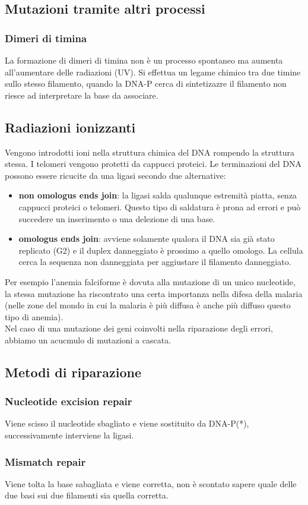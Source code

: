     \subsection{Mutazioni tramite altri processi}
        \subsubsection{Dimeri di timina}
            La formazione di dimeri di timina non è un processo spontaneo ma aumenta all'aumentare delle radiazioni (UV). Si effettua un legame chimico tra due timine sullo stesso filamento, quando la DNA-P cerca di sintetizazre il filamento non riesce ad interpretare la base da associare.
        \subsection{Radiazioni ionizzanti}
            Vengono introdotti ioni nella struttura chimica del DNA rompendo la struttura stessa.
            I telomeri vengono protetti da cappucci proteici.
            Le terminazioni del DNA possono essere ricucite da una ligasi secondo due alternative:
            \begin{itemize}
                \item \textbf{non omologus ends join}: la ligasi salda qualunque estremità piatta, senza cappucci proteici o telomeri. Questo tipo di saldatura è prona ad errori e può succedere un inserimento o una delezione di una base.
                \item \textbf{omologus ends join}: avviene solamente qualora il DNA sia già stato replicato (G2) e il duplex danneggiato è prossimo a quello omologo. La cellula cerca la sequenza non danneggiata per aggiustare il filamento danneggiato.
            \end{itemize} 
            Per esempio l'anemia falciforme è dovuta alla mutazione di un unico nucleotide, la stessa mutazione ha riscontrato una certa importanza nella difesa della malaria (nelle zone del mondo in cui la malaria è più diffusa è anche più diffuso questo tipo di anemia).\\
            Nel caso di una mutazione dei geni coinvolti nella riparazione degli errori, abbiamo un acucmulo di mutazioni a cascata.
        
     \subsection{Metodi di riparazione}
        \subsubsection{Nucleotide excision repair}
            Viene scisso il nucleotide sbagliato e viene sostituito da DNA-P(*), successivamente interviene la ligasi.
        \subsubsection{Mismatch repair}
            Viene tolta la base sabagliata e viene corretta, non è scontato sapere quale delle due basi sui due filamenti sia quella corretta.

\pagebreak